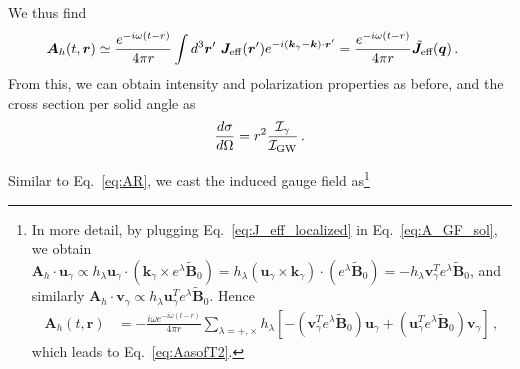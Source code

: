 \documentclass[a4paper,11pt]{article}
\begin{document}
%
We thus find
%
\begin{equation}
    \begin{aligned}
     {\bm A}_{h}(t, {\bm r} ) & \simeq 
    \frac{e^{- i \omega (t - r)}}{4\pi r} \int d^{3} {\bm r}^{\prime} ~ {\bm J}_{\rm eff} ({\bm r}^{\prime} ) e^{  - i ( \bm{k}_{\gamma} - {\bm k} ) \cdot {\bm r}^{\prime} } 
     =  \frac{e^{-i \omega (t - r)}}{4 \pi r} \tilde{ \bm{J} }_{\text{eff} } ( \bm{q}) \, .
    \end{aligned}
   \label{eq:A_GF_sol}
\end{equation}
%
From this, we can obtain intensity  and polarization properties as before, and the cross section per solid angle as
%
\begin{align}
\label{eq:cross_section}
     \frac{d\sigma}{d\Omega} =  r^{2} \frac{ \mathcal{I}_{\gamma}  }{ \mathcal{I}_{\rm GW} } \,.
\end{align}




Similar to Eq.~\eqref{eq:AR}, we cast the induced gauge field as\footnote{In more detail, by plugging  Eq.~\eqref{eq:J_eff_localized} in Eq.~\eqref{eq:A_GF_sol}, we obtain $ \bm{A}_{h} \cdot \bm{u}_{\gamma} \propto h_{\lambda}  \bm{u}_{\gamma} \cdot (\bm{k}_{\gamma}  \times e^{\lambda} \tilde{\bm{B}}_{0}  ) = h_{\lambda}  (\bm{u}_{\gamma} \times \bm{k}_{\gamma} ) \cdot ( e^{\lambda} \tilde{\bm{B}}_{0} ) = - h_{\lambda} \bm{v}_{\gamma}^{T} e^{\lambda} \tilde{\bm{B}}_{0}  $, and similarly $\bm{A}_{h} \cdot \bm{v}_{\gamma} \propto h_{\lambda} \bm{u}_{\gamma}^{T} e^{\lambda} \tilde{\bm{B}}_{0}   $.
%
Hence
%
\begin{equation}
\begin{aligned}
   {\bm A}_{h}(t, {\bm r} ) & = - \frac{ i \omega e^{- i \omega (t-r)} }{4\pi r}  \sum_{\lambda = +, \times} h_{\lambda} \left[ - \left( \bm{v}_{\gamma}^{T} e^{\lambda} \tilde{\bm{B}}_{0}   \right) \bm{u}_{\gamma} + \left( \bm{u}_{\gamma}^{T} e^{\lambda} \tilde{\bm{B}}_{0}   \right) \bm{v}_{\gamma}  \right]
\,,
\end{aligned}
\label{eq:Ainfootnote}
\end{equation}
%
which leads to Eq.~\eqref{eq:AasofT2}.
}
\end{document}
